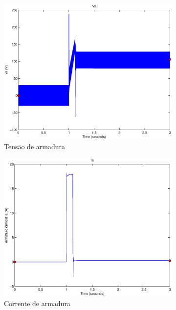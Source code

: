 \documentclass{article}
\begin{document}
\begin{figure}[H]
	\centering
	\begin{subfigure}{0.45\textwidth}
		\includegraphics[width=\linewidth]{matlab/va3}
		\caption{Tensão de armadura}
	\end{subfigure}
	\begin{subfigure}{0.45\textwidth}
		\includegraphics[width=\linewidth]{matlab/ia3}
		\caption{Corrente de armadura}
	\end{subfigure}
	\begin{subfigure}{0.45\textwidth}

\end{subfigure}
\end{figure}
\end{document}

